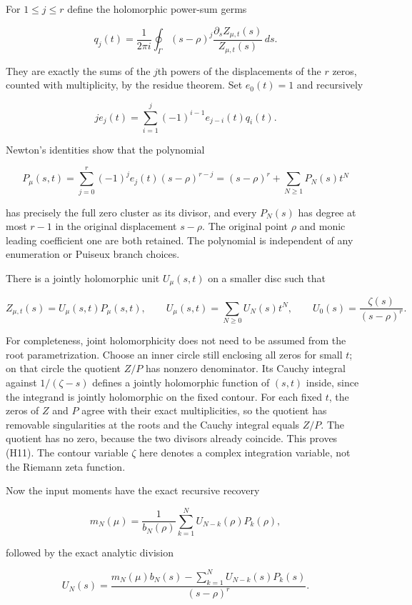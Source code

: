 For \(1\le j\le r\) define the holomorphic power-sum germs

\[
q_j(t)=\frac{1}{2\pi i}\oint_\Gamma
(s-\rho)^j\frac{\partial_s Z_{\mu,t}(s)}{Z_{\mu,t}(s)}\,ds.
\]

They are exactly the sums of the \(j\)th powers of the displacements of the \(r\) zeros, counted with multiplicity, by the residue theorem. Set \(e_0(t)=1\) and recursively

\[
j e_j(t)=\sum_{i=1}^j(-1)^{i-1}e_{j-i}(t)q_i(t).
\]

Newton's identities show that the polynomial

\[
P_\mu(s,t)=\sum_{j=0}^r(-1)^je_j(t)(s-\rho)^{r-j}
=(s-\rho)^r+\sum_{N\ge1}P_N(s)t^N
\tag{H10}
\]

has precisely the full zero cluster as its divisor, and every \(P_N(s)\) has degree at most \(r-1\) in the original displacement \(s-\rho\). The original point \(\rho\) and monic leading coefficient one are both retained. The polynomial is independent of any enumeration or Puiseux branch choices.

There is a jointly holomorphic unit \(U_\mu (s,t)\) on a smaller disc such that

\[
Z_{\mu,t}(s)=U_\mu(s,t)P_\mu(s,t),\qquad
U_\mu(s,t)=\sum_{N\ge0}U_N(s)t^N,
\qquad U_0(s)=\frac{\zeta(s)}{(s-\rho)^r}.
\tag{H11}
\]

For completeness, joint holomorphicity does not need to be assumed from the root parametrization. Choose an inner circle still enclosing all zeros for small \(t\); on that circle the quotient \(Z/P\) has nonzero denominator. Its Cauchy integral against \(1/(\zeta-s)\) defines a jointly holomorphic function of \((s,t)\) inside, since the integrand is jointly holomorphic on the fixed contour. For each fixed \(t\), the zeros of \(Z\) and \(P\) agree with their exact multiplicities, so the quotient has removable singularities at the roots and the Cauchy integral equals \(Z/P\). The quotient has no zero, because the two divisors already coincide. This proves (H11). The contour variable \(\zeta\) here denotes a complex integration variable, not the Riemann zeta function.

Now the input moments have the exact recursive recovery

\[
\boxed{
m_N(\mu)=\frac{1}{b_N(\rho)}
\sum_{k=1}^{N}U_{N-k}(\rho)P_k(\rho),
}\tag{H12}
\]

followed by the exact analytic division

\[
\boxed{
U_N(s)=\frac{
m_N(\mu)b_N(s)-\sum_{k=1}^NU_{N-k}(s)P_k(s)
}{(s-\rho)^r}.
}\tag{H13}
\]

